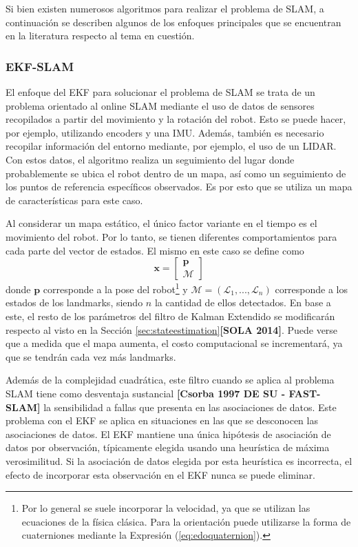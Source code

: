 Si bien existen numerosos algoritmos para realizar el problema de SLAM, a continuación se describen algunos de los enfoques principales que se encuentran en la literatura respecto al tema en cuestión.

\subsubsection{EKF-SLAM}
El enfoque del EKF para solucionar el problema de SLAM se trata de un problema orientado al online SLAM mediante el uso de datos de sensores recopilados a partir del movimiento y la rotación del robot. Esto se puede hacer, por ejemplo, utilizando encoders y una IMU. Además, también es necesario recopilar información del entorno mediante, por ejemplo, el uso de un LIDAR. Con estos datos, el algoritmo realiza un seguimiento del lugar donde probablemente se ubica el robot dentro de un mapa, así como un seguimiento de los puntos de referencia específicos observados. Es por esto que se utiliza un mapa de características para este caso.

Al considerar un mapa estático, el único factor variante en el tiempo es el movimiento del robot. Por lo tanto, se tienen diferentes comportamientos para cada parte del vector de estados. El mismo en este caso se define como
\begin{equation}
    \bm{x} = 
    \begin{bmatrix}
        \bm{p} \\
        \bm{\mathcal{M}}
    \end{bmatrix}
\end{equation}
donde $\bm{p}$ corresponde a la pose del robot\footnote{Por lo general se suele incorporar la velocidad, ya que se utilizan las ecuaciones de la física clásica. Para la orientación puede utilizarse la forma de cuaterniones mediante la Expresión (\ref{eq:edoquaternion}).} y $\bm{\mathcal{M}}=(\mathcal{L}_1,...,\mathcal{L}_n)$ corresponde a los estados de los landmarks, siendo $n$ la cantidad de ellos detectados. En base a este, el resto de los parámetros del filtro de Kalman Extendido se modificarán respecto al visto en la Sección \ref{sec:stateestimation}\textbf{[SOLA 2014]}. Puede verse que a medida que el mapa aumenta, el costo computacional se incrementará, ya que se tendrán cada vez más landmarks.

Además de la complejidad cuadrática, este filtro cuando se aplica al problema SLAM tiene como desventaja sustancial \textbf{[Csorba 1997 DE SU - FAST-SLAM]}
la sensibilidad a fallas que presenta en las asociaciones de datos. Este problema con el EKF se aplica en situaciones en las que se desconocen las asociaciones de datos. El EKF mantiene una única hipótesis de asociación de datos por observación, típicamente elegida usando una heurística de máxima verosimilitud. Si la asociación de datos elegida por esta heurística es incorrecta, el efecto de incorporar esta observación en el EKF nunca se puede eliminar.

